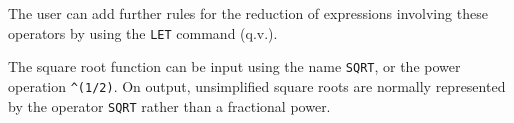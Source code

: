 
The user can add further rules for the reduction of expressions involving
these operators by using the {\tt LET}  command (q.v.).

The square root function can be input using the name {\tt SQRT}, or the
power operation {\tt \^{ }(1/2)}.  On output, unsimplified square roots
are normally represented by the operator {\tt SQRT} rather than a
fractional power.


